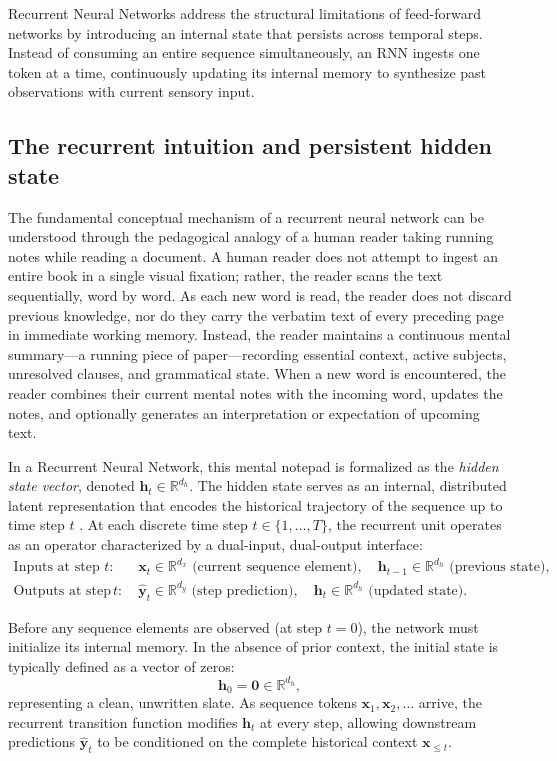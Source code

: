 \documentclass[../../main.tex]{subfiles}
\begin{document}
Recurrent Neural Networks address the structural limitations of feed-forward networks by introducing an internal state that persists across temporal steps. Instead of consuming an entire sequence simultaneously, an RNN ingests one token at a time, continuously updating its internal memory to synthesize past observations with current sensory input.

\subsection{The recurrent intuition and persistent hidden state}
\label{subsec:rnn_intuition_hidden_state}

The fundamental conceptual mechanism of a recurrent neural network can be understood through the pedagogical analogy of a human reader taking running notes while reading a document. A human reader does not attempt to ingest an entire book in a single visual fixation; rather, the reader scans the text sequentially, word by word. As each new word is read, the reader does not discard previous knowledge, nor do they carry the verbatim text of every preceding page in immediate working memory. Instead, the reader maintains a continuous mental summary—a running piece of paper—recording essential context, active subjects, unresolved clauses, and grammatical state. When a new word is encountered, the reader combines their current mental notes with the incoming word, updates the notes, and optionally generates an interpretation or expectation of upcoming text.

In a Recurrent Neural Network, this mental notepad is formalized as the \textit{hidden state vector}, denoted $\mathbf{h}_t \in \mathbb{R}^{d_h}$. The hidden state serves as an internal, distributed latent representation that encodes the historical trajectory of the sequence up to time step $t$ \citep{elman1990}. At each discrete time step $t \in \{1, \dots, T\}$, the recurrent unit operates as an operator characterized by a dual-input, dual-output interface:
\begin{align}
\text{Inputs at step } t: & \quad \mathbf{x}_t \in \mathbb{R}^{d_x} \text{ (current sequence element)}, \quad \mathbf{h}_{t-1} \in \mathbb{R}^{d_h} \text{ (previous state)}, \\
\text{Outputs at step } t: & \quad \hat{\mathbf{y}}_t \in \mathbb{R}^{d_y} \text{ (step prediction)}, \quad \mathbf{h}_t \in \mathbb{R}^{d_h} \text{ (updated state)}.
\end{align}

Before any sequence elements are observed (at step $t = 0$), the network must initialize its internal memory. In the absence of prior context, the initial state is typically defined as a vector of zeros:
\begin{equation}
\mathbf{h}_0 = \mathbf{0} \in \mathbb{R}^{d_h},
\label{eq:rnn_zero_initialization}
\end{equation}
representing a clean, unwritten slate. As sequence tokens $\mathbf{x}_1, \mathbf{x}_2, \dots$ arrive, the recurrent transition function modifies $\mathbf{h}_t$ at every step, allowing downstream predictions $\hat{\mathbf{y}}_t$ to be conditioned on the complete historical context $\mathbf{x}_{\le t}$.
\end{document}
